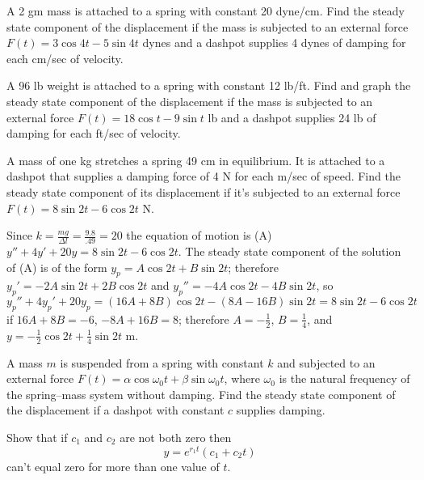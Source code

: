 \documentclass{ximera}
\begin{document}
\begin{problem}\label{exer:6.2.18}
A 2 gm mass is attached to a spring with constant 20 dyne/cm. Find the
steady state component of the displacement if the mass is subjected to
an external force $F(t)=3\cos4t-5\sin4t$ dynes and a dashpot supplies
4 dynes of damping for each cm/sec of velocity.
\end{problem}

\begin{problem}\label{exer:6.2.19}  
A 96 lb weight is attached to a spring with constant 12 lb/ft. Find
and graph the steady state component of the displacement if the mass is
subjected to an external force $F(t)=18\cos t-9\sin t$ lb and a
dashpot supplies 24 lb of damping for each ft/sec of velocity.
\end{problem}

\begin{problem}\label{exer:6.2.20}
A mass of one kg stretches a spring 49 cm in equilibrium. It is
attached to a dashpot that supplies a damping force of 4 N for each
m/sec of speed. Find the steady state component of its displacement if
it's subjected to an external force $F(t)=8\sin2t-6\cos2t$ N.

\begin{solution}
Since $k=\frac{mg}{\Delta l}=\frac{9.8}{.49}=20$ the
equation of motion is
(A) $y''+4y'+20y=8\sin2t-6\cos2t$.
The steady state component of the solution of (A)
is of the form
$y_p=A\cos2t+B\sin2t$; therefore $y_p'=-2A\sin2t+2B\cos2t$
and $y_p''=-4A\cos2t-4B\sin2t$, so
$y_p''+4y_p'+20y_p=(16A+8B)\cos2t-(8A-16B)\sin2t=8\sin2t-6\cos2t$
if $16A+8B=-6$, $-8A+16B=8$; therefore $A=-\frac{1}{2}$,
$B=\frac{1}{4}$, and
$y=-\frac{1}{2}\cos2t+\frac{1}{4}\sin2t$ m.
\end{solution}
\end{problem}

\begin{problem}\label{exer:6.2.21}
A mass $m$ is suspended from a spring with constant $k$ and subjected to an
external force $F(t)=\alpha\cos\omega_0t+\beta\sin\omega_0t$, where
$\omega_0$ is the natural frequency of the spring--mass system without
damping. Find the steady state component of the displacement if a dashpot
with constant $c$ supplies damping.
\end{problem}

\begin{problem}\label{exer:6.2.22}
Show that if $c_1$ and $c_2$ are not both zero then
$$
y=e^{r_1t}(c_1+c_2t)
$$
can't equal zero for more than one value of
$t$.
\end{problem}
\end{document}
